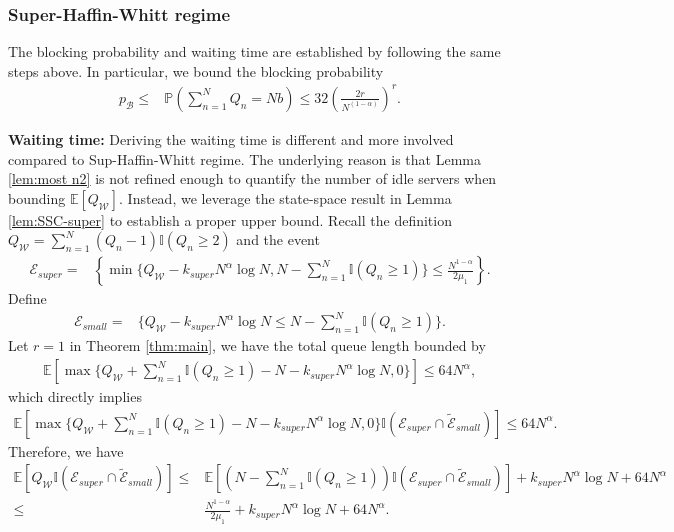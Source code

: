 \documentclass[11pt,oneside,letter]{article}
\begin{document}
\subsubsection*{Super-Haffin-Whitt regime}
The blocking probability and waiting time are established by following the same steps above. In particular, we bound the blocking probability 
\begin{align*}
p_{\mathcal B}
\leq& \mathbb P\left(\sum_{n=1}^N Q_n = Nb\right)  
\leq 32\left(\frac{2 r}{N^{(1 - \alpha)}}\right)^r.
\end{align*}

\vspace{3 pt}
{\bf Waiting time:} 
Deriving the waiting time is different and more involved compared to Sup-Haffin-Whitt regime. The underlying reason is that Lemma \ref{lem:most n2} is not refined enough to quantify the number of idle servers when bounding $\mathbb E[Q_{\mathcal W}]$. Instead, we leverage the state-space result in Lemma \ref{lem:SSC-super} to establish a proper upper bound. 
Recall the definition $Q_{\mathcal W} = \sum_{n=1}^N(Q_n-1)\mathbb I(Q_n \geq 2)$ and the event 
\begin{align}
\mathcal E_{super}=&\left\{  
\min\{Q_{\mathcal W}- k_{super} N^\alpha \log N, N - \sum_{n=1}^N\mathbb I(Q_n \geq 1) \}\leq \frac{N^{1-\alpha}}{2\mu_1} \right\}. \nonumber
\end{align}
Define
\begin{align}
\mathcal E_{small}=&\{Q_{\mathcal W}- k_{super} N^\alpha \log N \leq N - \sum_{n=1}^N\mathbb I(Q_n \geq 1)\}. \nonumber  
\end{align}
Let $r=1$ in Theorem \ref{thm:main}, we have the total queue length bounded by
\begin{align}
\mathbb{E}[\max\{Q_{\mathcal W}+\sum_{n=1}^N\mathbb I(Q_n \geq 1)-N - k_{super}N^\alpha\log N,0\}] \leq 64N^\alpha, \nonumber
\end{align}
which directly implies  
\begin{align}
\mathbb{E}[\max\{Q_{\mathcal W}+\sum_{n=1}^N\mathbb I(Q_n \geq 1)-N - k_{super}N^\alpha\log N,0\} \mathbb I(\mathcal E_{super} \cap \tilde{\mathcal E}_{small})] \leq 64N^\alpha. \nonumber
\end{align}
Therefore, we have 
\begin{align}
\mathbb{E}[Q_{\mathcal W} \mathbb I(\mathcal E_{super} \cap \tilde{\mathcal E}_{small})] \leq& \mathbb{E}[(N-\sum_{n=1}^N\mathbb I(Q_n \geq 1))\mathbb I(\mathcal E_{super} \cap \tilde{\mathcal E}_{small})] + k_{super} N^\alpha\log N + 64N^\alpha \nonumber\\
\leq& \frac{N^{1-\alpha}}{2\mu_1}   + k_{super} N^\alpha\log N + 64N^\alpha. \nonumber
\end{align}
\end{document}
